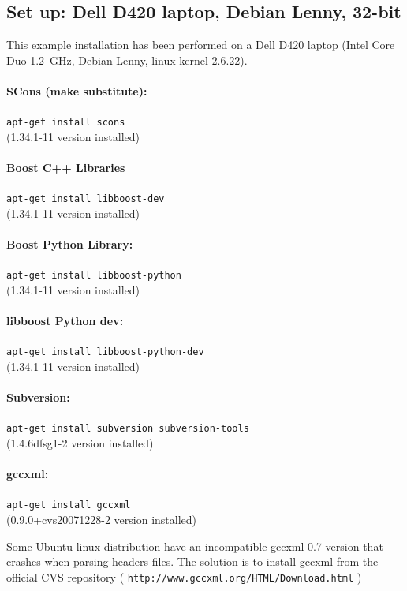 \documentclass[12pt,a4paper]{article}
\begin{document}
\subsection{Set up: Dell D420 laptop, Debian Lenny, 32-bit}
This example installation has been performed on a Dell D420 laptop (Intel
Core Duo 1.2~GHz, Debian Lenny, linux kernel 2.6.22).

\paragraph{SCons (make substitute):} {\tt apt-get install scons} \\
(1.34.1-11 version installed)


\paragraph{Boost C++ Libraries} {\tt apt-get install libboost-dev} \\
(1.34.1-11 version installed)


\paragraph{Boost Python Library:} {\tt apt-get install libboost-python} \\
(1.34.1-11 version installed)


\paragraph{libboost Python dev:} {\tt apt-get install libboost-python-dev} \\
(1.34.1-11 version installed)

\paragraph{Subversion:} {\tt apt-get install subversion subversion-tools} \\
(1.4.6dfsg1-2 version installed)

\paragraph{gccxml:} {\tt apt-get install gccxml} \\
(0.9.0+cvs20071228-2 version installed)

Some Ubuntu linux distribution have an incompatible gccxml 0.7 version that crashes when parsing headers files. The solution is to install gccxml from the official CVS repository ( {\tt http://www.gccxml.org/HTML/Download.html} )
\end{document}
